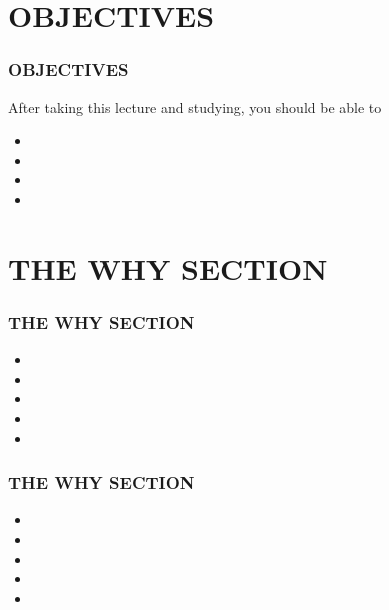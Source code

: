 \documentclass[aspectratio=169]{beamer}
\begin{document}
	\section{\Large OBJECTIVES}
	\begin{frame}
		\frametitle{\LARGE OBJECTIVES}
		\large After \color{green}taking this lecture \color{white}and
		\color{red}studying\color{white}, you should be able to
		\vspace{1em}
		\begin{itemize}
			\setlength \itemsep{1em}
			\item \large
			\item \large
			\item \large
			\item \large
		\end{itemize}
	\end{frame}
	\section{\Large THE WHY SECTION}
	\begin{frame}[t]
		\frametitle{\LARGE THE WHY SECTION}
		\begin{itemize}
			\setlength\itemsep{1em}
			\item \large
			\item \large
			\item \large
			\item \large
			\item \large
		\end{itemize}
	\end{frame}
	\begin{frame}[t]
		\frametitle{\LARGE THE WHY SECTION}
		\begin{itemize}
			\setlength\itemsep{1em}
			\item \large
			\item \large
			\item \large
			\item \large
			\item \large
		\end{itemize}
	\end{frame}
\end{document}
